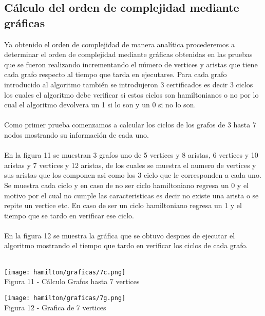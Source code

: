 \documentclass[12pt,twoside]{article}
\begin{document}
\subsection{Cálculo del orden de complejidad mediante gráficas}
Ya obtenido el orden de complejidad de manera analítica procederemos a determinar el orden de complejidad mediante gráficas obtenidas en las pruebas que se fueron realizando incrementando el número de vertices y aristas que tiene cada grafo respecto al tiempo que tarda en  ejecutarse. Para cada grafo introducido al algoritmo también se introdujeron 3 certificados es decir 3 ciclos los cuales el algoritmo debe verificar si estos ciclos son hamiltonianos o no por lo cual el algoritmo devolvera un 1 si lo son y un 0 si no lo son.\\\\
Como primer prueba comenzamos a calcular los ciclos de los grafos de 3 hasta 7 nodos mostrando su información de cada uno. \\\\
En la figura 11 se muestran 3 grafos uno de 5 vertices y 8 aristas, 6 vertices y 10 aristas y 7 vertices y 12 aristas, de los cuales se muestra el numero de vertices y sus aristas que los componen asi como los 3 ciclo que le corresponden a cada uno. Se muestra cada ciclo y en caso de no ser ciclo hamiltoniano regresa un 0 y el motivo por el cual no cumple las caracteristicas es decir no existe una arista o se repite un vertice etc. En caso de ser un ciclo hamiltoniano regresa un 1 y el tiempo que se tardo en verificar ese ciclo. \\\\
En la figura 12 se muestra la gráfica que se obtuvo despues de ejecutar el algoritmo mostrando el tiempo que tardo en verificar los ciclos de cada grafo.\\\\
\begin{center}
    \texttt{[image: hamilton/graficas/7c.png]}\\
    Figura 11 - Cálculo Grafos hasta 7 vertices
\end{center}
\begin{center}
    \texttt{[image: hamilton/graficas/7g.png]}\\
    Figura 12 - Grafica de 7 vertices
\end{center}
\end{document}
